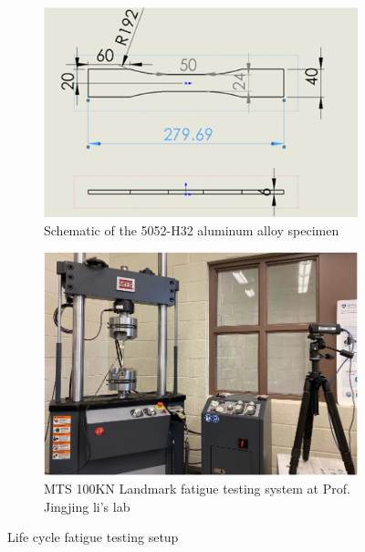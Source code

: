 \begin{figure}[tb]
  \begin{subfigure}[t]{0.50\linewidth}
    \includegraphics[height=0.7\textwidth]{fig/specimen_dim.png}
    \caption{Schematic of the 5052-H32 aluminum alloy specimen}
    \label{fig: specimen dim}
  \end{subfigure}
  \begin{subfigure}[t]{0.50\linewidth}
    \includegraphics[height=0.7\textwidth]{fig/fatigue_testing_machine.png}
    \caption{MTS 100KN Landmark fatigue testing system at Prof. Jingjing li's lab}
    \label{fig: fatigue testing machine}
  \end{subfigure}

  \caption{Life cycle fatigue testing setup}
  \label{fig: fatigue testing setup}
\end{figure}

